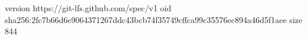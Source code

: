 version https://git-lfs.github.com/spec/v1
oid sha256:2fc7b66d6e9064371267ddc43bcb74f35749cffca99c35576ec894a46d5f1aee
size 844

